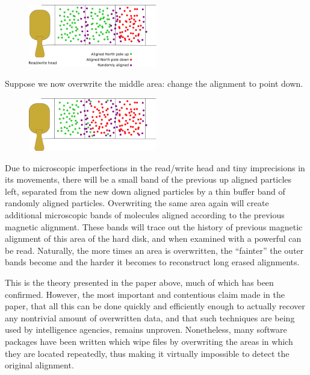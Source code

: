 	\begin{figure}[H]
	   \centering
	   \includegraphics[width=0.5\textwidth]{../sections/seasons/season1/111/images/111(3).png} 
	\end{figure}


Suppose we now overwrite the middle area: change the alignment to point down.


	\begin{figure}[H]
	   \centering
	   \includegraphics[width=0.5\textwidth]{../sections/seasons/season1/111/images/111(4).png} 
	\end{figure}


Due to microscopic imperfections in the read/write head and tiny imprecisions in its movements, there will be a small band of the previous up aligned particles left, separated from the new down aligned particles by a thin buffer band of randomly aligned particles. Overwriting the same area again will create additional microscopic bands of molecules aligned according to the previous magnetic alignment. These bands will trace out the history of previous magnetic alignment of this area of the hard disk, and when examined with a powerful  can be read. Naturally, the more times an area is overwritten, the ``fainter'' the outer bands become and the harder it becomes to reconstruct long erased alignments.


This is the theory presented in the paper above, much of which has been confirmed. However, the most important and contentious claim made in the paper, that all this can be done quickly and efficiently enough to actually recover any nontrivial amount of overwritten data, and that such techniques are being used by intelligence agencies, remains unproven. Nonetheless, many software packages have been written which wipe files by overwriting the areas in which they are located repeatedly, thus making it virtually impossible to detect the original alignment.